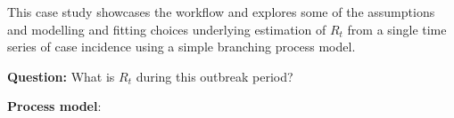 \documentclass{article}
\begin{document}
This case study showcases the workflow and explores some of the assumptions and modelling and fitting choices underlying estimation of $R_t$ from a single time series of case incidence using a simple branching process model.


\textbf{Question:} What is $R_t$ during this outbreak period?



\textbf{Process model}:
 
\end{document}
